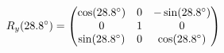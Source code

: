 \documentclass[preview]{standalone}
\begin{document}
\begin{align*}
\special{dvisvgm:raw <g id='unique000'>}R_y(28.8^\circ) = \begin{pmatrix} \cos(28.8^\circ) & 0 & -\sin(28.8^\circ) \\ 0 & 1 & 0 \\ \sin(28.8^\circ) & 0 & \cos(28.8^\circ) \end{pmatrix}\special{dvisvgm:raw </g>}
\end{align*}
\end{document}
